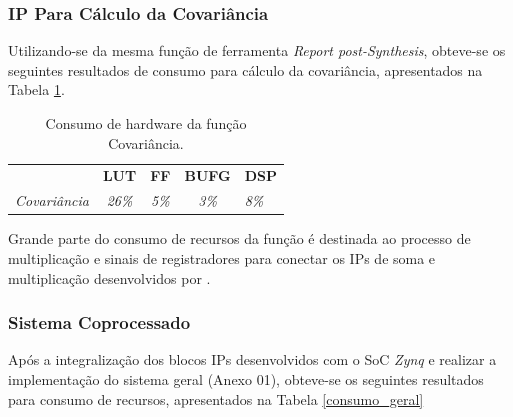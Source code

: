 \subsubsection{IP Para Cálculo da Covariância}
Utilizando-se da mesma função de ferramenta \textit{Report post-Synthesis}, obteve-se os seguintes resultados de consumo para cálculo da covariância, apresentados na Tabela \ref{consumo_cov}.

\begin{table}[!h]
	\centering
	\caption{Consumo de hardware da função Covariância.}
	\label{consumo_cov}
	\begin{tabular}{ccccl}
		\textbf{}         & \textbf{LUT}  & \textbf{FF}  & \textbf{BUFG} & \textbf{DSP} \\
		\textit{Covariância} & \textit{26\%} & \textit{5\%} & \textit{3\%}  & \textit{8\%}
	\end{tabular}
\end{table}

Grande parte do consumo de recursos da função é destinada ao processo de multiplicação e sinais de registradores para conectar os IPs de soma e multiplicação desenvolvidos por \cite{munoz2010tradeoff}.

\subsubsection{Sistema Coprocessado}

Após a integralização dos blocos IPs desenvolvidos com o SoC \textit{Zynq} e realizar a implementação do sistema geral (Anexo 01), obteve-se os seguintes resultados para consumo de recursos, apresentados na Tabela \ref{consumo_geral}

